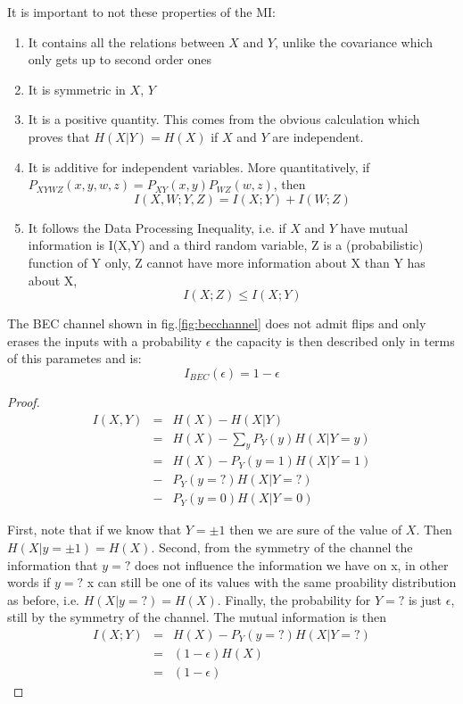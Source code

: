 It is important to not these properties of the MI:
\begin{enumerate}
	\item It contains all the relations between $X$ and $Y$, unlike the covariance which only gets up to second order ones
	\item It is symmetric in $X$, $Y$
	\item It is a positive quantity. This comes from the obvious calculation which proves that $H(X|Y) = H(X)$ if $X$ and $Y$ are independent.   
	\item It is additive for independent variables. More quantitatively, if $P_{XYWZ}(x,y,w,z) = P_{XY}(x,y) P_{WZ}(w,z)$, then $$I(X,W; Y,Z) = I(X;Y) + I(W;Z)$$
	\item It follows the Data Processing Inequality, i.e. if $X$ and $Y$ have mutual information is I(X,Y) and a third random variable, Z is a (probabilistic) function of Y only, Z cannot have more information about X than Y has about X, $$I(X;Z) \le I(X;Y)
	$$
\end{enumerate}

\begin{example}
The BEC channel shown in fig.\ref{fig:becchannel} does not admit flips and only erases the inputs with a probability $\epsilon$ the capacity is then described only in terms of this parametes and is:
\begin{equation}
I_{BEC}(\epsilon) = 1-\epsilon
\end{equation}

\begin{proof}
\begin{eqnarray}
	I(X,Y) &=& H(X) - H(X|Y) \\
		   &=& H(X) - \sum_{y}P_Y(y)H(X|Y=y) \\
		   &=& H(X) - P_Y(y=1)H(X|Y=1) \\
		   &-& P_Y(y=?)H(X|Y=?) \\
		   &-& P_Y(y=0)H(X|Y=0) 
\end{eqnarray}
	
First, note that if we know that $Y = \pm 1$ then we are sure of the value of $X$. Then $H(X|y =\pm 1) = H(X)$. Second, from the symmetry of the channel the information that $y=?$ does not influence the information we have on x, in other words if $y=?$ x can still be one of its values with the same proability distribution as before, i.e. $H(X|y=?) = H(X)$. Finally, the probability for $Y=?$ is just $\epsilon$, still by the symmetry of the channel.
The mutual information is then 
\begin{eqnarray}
I(X;Y) &=& H(X) - P_Y(y=?)H(X|Y=?) \\
		&=& (1 -\epsilon)H(X) \\
		&=&  (1 -\epsilon)
\end{eqnarray}
\end{proof}
\end{example}

